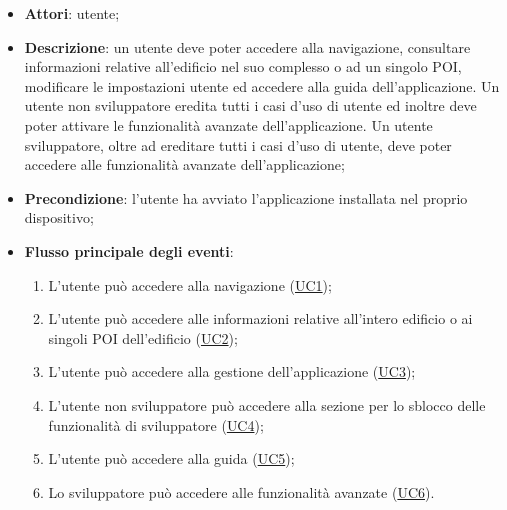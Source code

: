 \documentclass[../AnalisiDeiRequisiti.tex]{subfiles}
\begin{document}
\begin{itemize}
	\item \textbf{Attori}: utente;
	\item \textbf{Descrizione}: un utente deve poter accedere alla navigazione, consultare informazioni relative all'edificio nel suo complesso o ad un singolo POI, modificare le impostazioni utente ed accedere alla guida dell'applicazione. Un utente non sviluppatore eredita tutti i casi d'uso di utente ed inoltre deve poter attivare le funzionalità avanzate dell'applicazione. Un utente sviluppatore, oltre ad ereditare tutti i casi d'uso di utente, deve poter accedere alle funzionalità avanzate dell'applicazione; 
	\item \textbf{Precondizione}: l'utente ha avviato l'applicazione installata nel proprio dispositivo;
	
	\item \textbf{Flusso principale degli eventi}:
	\begin{enumerate}
		\item L'utente può accedere alla navigazione (\hyperlink{UC1}{UC1});
		\item L'utente può accedere alle informazioni relative all'intero edificio o ai singoli POI dell'edificio (\hyperlink{UC2}{UC2});
		\item L'utente può accedere alla gestione dell'applicazione (\hyperlink{UC3}{UC3});
		\item L'utente non sviluppatore può accedere alla sezione per lo sblocco delle funzionalità di sviluppatore (\hyperlink{UC4}{UC4});
		\item L'utente può accedere alla guida (\hyperlink{UC5}{UC5});
		\item Lo sviluppatore può accedere alle funzionalità avanzate (\hyperlink{UC6}{UC6}).
		

\end{enumerate}
\end{itemize}
\end{document}
